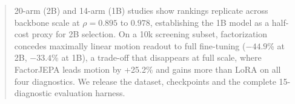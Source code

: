 \documentclass[letterpaper]{article} %
\begin{document}
\begin{abstract}
20-arm (2B) and 14-arm (1B) studies show rankings replicate across backbone scale at $\rho=0.895$ to $0.978$, establishing the 1B model as a half-cost proxy for 2B selection. On a 10k screening subset, factorization concedes maximally linear motion readout to full fine-tuning ($-44.9$\% at 2B, $-33.4$\% at 1B), a trade-off that disappears at full scale, where FactorJEPA leads motion by +25.2\% and gains more than LoRA on all four diagnostics. We release the dataset, checkpoints and the complete 15-diagnostic evaluation harness.





\end{abstract}



















% 

% 
\end{document}
